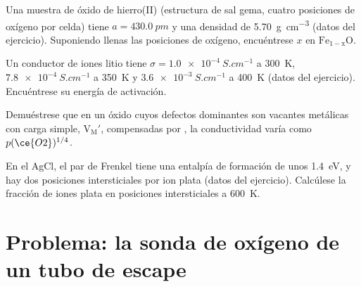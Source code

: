 \begin{exercise}[$\star\star$]\label{exo:b3:solid-state:9}
Una muestra de óxido de hierro(II) (estructura de sal gema, cuatro posiciones de oxígeno por celda) tiene
$a = \qty{430.0}{pm}$ y una densidad de \qty{5.70}{g.cm^{-3}} (datos del ejercicio). Suponiendo
llenas las posiciones de oxígeno, encuéntrese $x$ en $\mathrm{Fe_{1-x}O}$.
\end{exercise}

\begin{exercise}[$\star\star\star$]\label{exo:b3:solid-state:10}
Un conductor de iones litio tiene $\sigma = \qty{1.0e-4}{S.cm^{-1}}$ a \qty{300}{K}, $\qty{7.8e-4}{S.cm^{-1}}$ a \qty{350}{K} y
$\qty{3.6e-3}{S.cm^{-1}}$ a \qty{400}{K} (datos del ejercicio). Encuéntrese su energía de activación.
\end{exercise}

\begin{exercise}[$\star\star\star$]\label{exo:b3:solid-state:11}
Demuéstrese que en un óxido cuyos defectos dominantes son vacantes metálicas con carga simple,
$\mathrm{V_M'}$, compensadas por , la conductividad varía como $p(\ce{O2})^{1/4}$.
\end{exercise}

\begin{exercise}[$\star\star\star$]\label{exo:b3:solid-state:12}
En el AgCl, el par de Frenkel tiene una entalpía de formación de unos \qty{1.4}{eV}, y hay
dos posiciones intersticiales por ion plata (datos del ejercicio). Calcúlese la fracción
de iones plata en posiciones intersticiales a \qty{600}{K}.
\end{exercise}

\section{Problema: la sonda de oxígeno de un tubo de escape}

